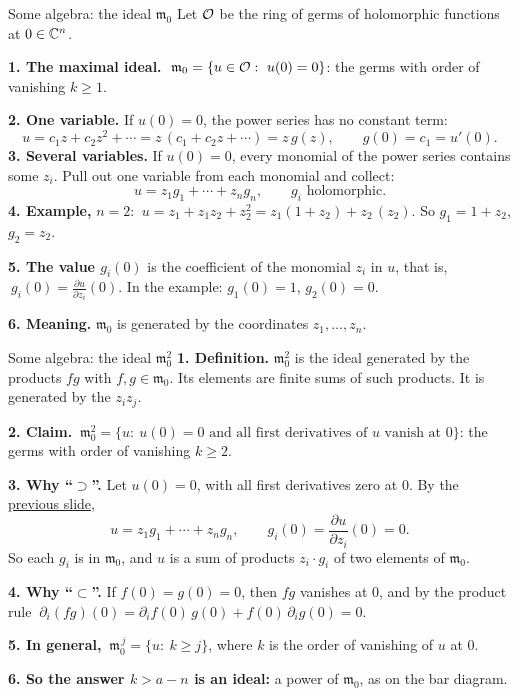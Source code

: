 \begin{frame}{Some algebra: the ideal \(\mathfrak m_0\)}
\label{fr:ideal-m0}
Let \(\mathcal O\) be the ring of germs of holomorphic functions at \(0\in\mathbb C^n\).
\par
\textbf{1. The maximal ideal.} \(\ \mathfrak m_0=\{u\in\cO:\ u(0)=0\}\): the germs with order of vanishing \(k\ge1\).
\par
\textbf{2. One variable.} If \(u(0)=0\), the power series has no constant term:
\[
u=c_1z+c_2z^2+\cdots=z\,(c_1+c_2z+\cdots)=z\,g(z),\qquad g(0)=c_1=u'(0).
\]
\textbf{3. Several variables.} If \(u(0)=0\), every monomial of the power series contains some \(z_i\). Pull out one variable from each monomial and collect:
\[
\boxed{u=z_1g_1+\cdots+z_ng_n,}\qquad g_i \text{ holomorphic}.
\]
\textbf{4. Example,} \(n=2\): \(\ u=z_1+z_1z_2+z_2^2=z_1(1+z_2)+z_2\,(z_2)\). So \(g_1=1+z_2\), \(g_2=z_2\).
\par\vspace{-1pt}
\textbf{5. The value \(g_i(0)\)} is the coefficient of the monomial \(z_i\) in \(u\), that is,
\(\ g_i(0)=\frac{\partial u}{\partial z_i}(0)\).
In the example: \(g_1(0)=1\), \(g_2(0)=0\).
\par
\textbf{6. Meaning.} \(\mathfrak m_0\) is generated by the coordinates \(z_1,\ldots,z_n\).
\end{frame}

\begin{frame}{Some algebra: the ideal \(\mathfrak m_0^2\)}
\textbf{1. Definition.} \(\mathfrak m_0^2\) is the ideal generated by the products \(fg\) with \(f,g\in\mathfrak m_0\). Its elements are finite sums of such products. It is generated by the \(z_iz_j\).
\par\medskip
\textbf{2. Claim.} \(\ \mathfrak m_0^2=\{u:\ u(0)=0 \text{ and all first derivatives of } u \text{ vanish at } 0\}\): the germs with order of vanishing \(k\ge2\).
\par\medskip
\textbf{3. Why ``\(\supset\)''.} Let \(u(0)=0\), with all first derivatives zero at \(0\). By the \hyperlink{fr:ideal-m0}{previous slide},
\[
u=z_1g_1+\cdots+z_ng_n,\qquad g_i(0)=\frac{\partial u}{\partial z_i}(0)=0 .
\]
So each \(g_i\) is in \(\mathfrak m_0\), and \(u\) is a sum of products \(z_i\cdot g_i\) of two elements of \(\mathfrak m_0\).
\par
\textbf{4. Why ``\(\subset\)''.} If \(f(0)=g(0)=0\), then \(fg\) vanishes at \(0\), and by the product rule
\(\ \partial_i(fg)(0)=\partial_if(0)\,g(0)+f(0)\,\partial_ig(0)=0\).
\par\medskip
\textbf{5. In general,} \(\ \boxed{\mathfrak m_0^{\,j}=\{u:\ k\ge j\}}\), where \(k\) is the order of vanishing of \(u\) at \(0\).
\par\medskip
\textbf{6. So the answer \(k>a-n\) is an ideal:} a power of \(\mathfrak m_0\), as on the bar diagram.
\end{frame}

